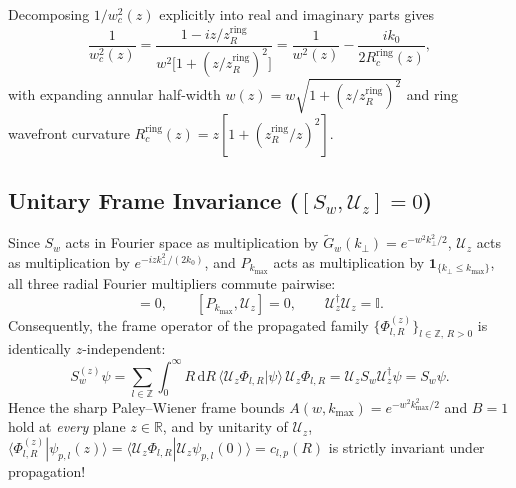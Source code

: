 \documentclass[10pt,letterpaper]{article}
\newcommand{\braket}[2]{\langle #1 | #2 \rangle}
\newcommand{\dd}{\mathrm{d}}
\numberwithin{equation}{section}
\begin{document}
Decomposing $1/w_c^2(z)$ explicitly into real and imaginary parts gives
\begin{equation}
  \frac{1}{w_c^2(z)} = \frac{1 - i z/z_R^{\mathrm{ring}}}{w^2\bigl[1 + (z/z_R^{\mathrm{ring}})^2\bigr]} = \frac{1}{w^2(z)} - \frac{i k_0}{2 R_c^{\mathrm{ring}}(z)},
\end{equation}
with expanding annular half-width $w(z) = w\sqrt{1+(z/z_R^{\mathrm{ring}})^2}$ and ring wavefront curvature $R_c^{\mathrm{ring}}(z) = z[1 + (z_R^{\mathrm{ring}}/z)^2]$.

\subsection{Unitary Frame Invariance ($[S_w, \mathcal{U}_z] = 0$)}
Since $S_w$ acts in Fourier space as multiplication by $\widetilde{G}_w(k_\perp) = e^{-w^2 k_\perp^2/2}$, $\mathcal{U}_z$ acts as multiplication by $e^{-iz k_\perp^2/(2k_0)}$, and $P_{k_{\max}}$ acts as multiplication by $\mathbf{1}_{\{k_\perp \le k_{\max}\}}$, all three radial Fourier multipliers commute pairwise:
\begin{equation}
  [S_w, \mathcal{U}_z] = 0, \qquad [P_{k_{\max}}, \mathcal{U}_z] = 0, \qquad \mathcal{U}_z^\dagger \mathcal{U}_z = \mathbb{I}.
\end{equation}
Consequently, the frame operator of the propagated family $\{\Phi_{l,R}^{(z)}\}_{l\in\mathbb{Z},\,R>0}$ is identically $z$-independent:
\begin{equation}
  S_w^{(z)}\psi = \sum_{l\in\mathbb{Z}}\int_0^\infty R\,\dd R\,\braket{\mathcal{U}_z\Phi_{l,R}}{\psi}\,\mathcal{U}_z\Phi_{l,R} = \mathcal{U}_z S_w \mathcal{U}_z^\dagger\psi = S_w\psi.
\end{equation}
Hence the sharp Paley--Wiener frame bounds $A(w,k_{\max}) = e^{-w^2 k_{\max}^2/2}$ and $B = 1$ hold at \emph{every} plane $z \in \mathbb{R}$, and by unitarity of $\mathcal{U}_z$, $\braket{\Phi_{l,R}^{(z)}}{\psi_{p,l}(z)} = \braket{\mathcal{U}_z\Phi_{l,R}}{\mathcal{U}_z\psi_{p,l}(0)} = c_{l,p}(R)$ is strictly invariant under propagation!
\end{document}
